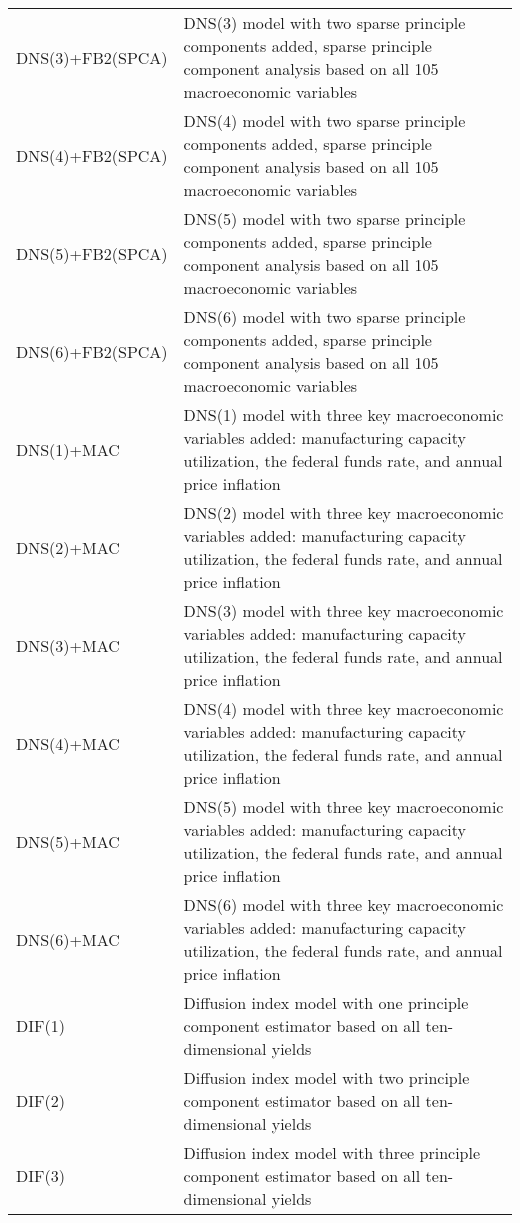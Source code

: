 \begin{table}[h]
{\begin{tabular}{ll}
DNS(3)+FB2(SPCA)          & DNS(3) model with two sparse principle components added, sparse principle component analysis based on all 105 macroeconomic variables \\
DNS(4)+FB2(SPCA)          & DNS(4) model with two sparse principle components added, sparse principle component analysis based on all 105 macroeconomic variables \\
DNS(5)+FB2(SPCA)          & DNS(5) model with two sparse principle components added, sparse principle component analysis based on all 105 macroeconomic variables \\
DNS(6)+FB2(SPCA)          & DNS(6) model with two sparse principle components added, sparse principle component analysis based on all 105 macroeconomic variables \\
DNS(1)+MAC                & DNS(1) model with three key macroeconomic variables added: manufacturing capacity utilization, the federal funds rate, and annual price inflation \\
DNS(2)+MAC                & DNS(2) model with three key macroeconomic variables added: manufacturing capacity utilization, the federal funds rate, and annual price inflation \\
DNS(3)+MAC                & DNS(3) model with three key macroeconomic variables added: manufacturing capacity utilization, the federal funds rate, and annual price inflation \\
DNS(4)+MAC                & DNS(4) model with three key macroeconomic variables added: manufacturing capacity utilization, the federal funds rate, and annual price inflation \\
DNS(5)+MAC                & DNS(5) model with three key macroeconomic variables added: manufacturing capacity utilization, the federal funds rate, and annual price inflation \\
DNS(6)+MAC                & DNS(6) model with three key macroeconomic variables added: manufacturing capacity utilization, the federal funds rate, and annual price inflation \\
DIF(1)                    & Diffusion index model with one principle component estimator based on all ten-dimensional yields \\
DIF(2)                    & Diffusion index model with two principle component estimator based on all ten-dimensional yields \\
DIF(3)                    & Diffusion index model with three principle component estimator based on all ten-dimensional yields \\

\end{tabular}}
\end{table}
